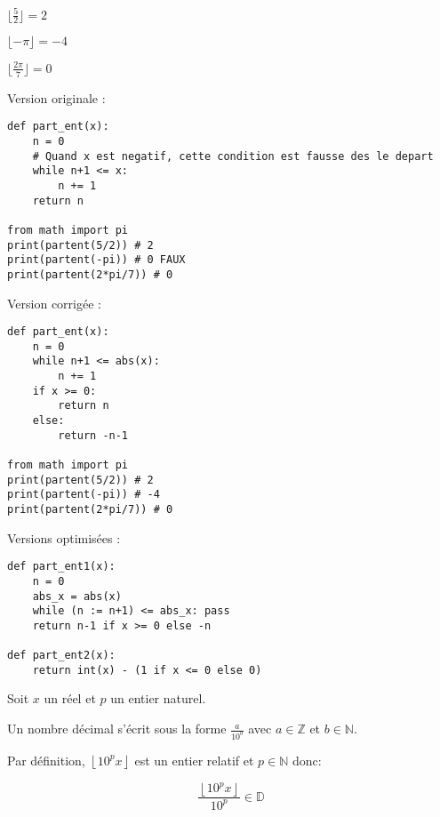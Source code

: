 \documentclass[]{../templates/homework}
\providecommand{\floor}[1]{\left \lfloor #1 \right \rfloor }
\begin{document}

\subproblem

$\lfloor\frac{5}{2}\rfloor = 2$

$\lfloor-\pi\rfloor = -4$

$\lfloor\frac{2\pi}{7}\rfloor = 0$

\hfill

Version originale :
\begin{vscodebox}
\begin{lstlisting}
def part_ent(x):
	n = 0
	# Quand x est negatif, cette condition est fausse des le depart
	while n+1 <= x:
		n += 1
	return n

from math import pi
print(partent(5/2)) # 2
print(partent(-pi)) # 0 FAUX
print(partent(2*pi/7)) # 0
\end{lstlisting}
\end{vscodebox}

\hfill

Version corrigée :

\begin{vscodebox}
\begin{lstlisting}
def part_ent(x):
	n = 0
	while n+1 <= abs(x):
		n += 1
	if x >= 0:
		return n
	else:
		return -n-1

from math import pi
print(partent(5/2)) # 2
print(partent(-pi)) # -4
print(partent(2*pi/7)) # 0
\end{lstlisting}
\end{vscodebox}

\hfill
\newpage
Versions optimisées :

\begin{vscodebox}
\begin{lstlisting}
def part_ent1(x):
	n = 0
	abs_x = abs(x)
	while (n := n+1) <= abs_x: pass
	return n-1 if x >= 0 else -n

def part_ent2(x):
	return int(x) - (1 if x <= 0 else 0)
\end{lstlisting}
\end{vscodebox}

\subproblem
\question
Soit $x$ un réel et $p$ un entier naturel.

Un nombre décimal s'écrit sous la forme $\frac{a}{10^b}$ avec $a \in \mathbb{Z}$ et $b \in \mathbb{N}$.

Par définition, $\floor{10^px}$ est un entier relatif et $p \in \mathbb{N}$ donc:

\begin{equation*}
	\frac{\floor{10^px}}{10^p} \in \mathbb{D}
\end{equation*}
\end{document}
